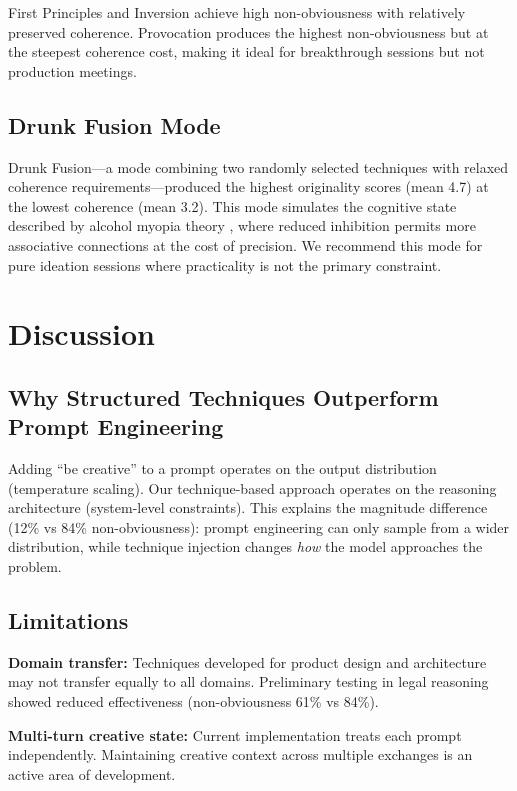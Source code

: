 \documentclass[11pt,a4paper]{article}
\begin{document}
First Principles and Inversion achieve high non-obviousness with relatively preserved coherence. Provocation produces the highest non-obviousness but at the steepest coherence cost, making it ideal for breakthrough sessions but not production meetings.

\subsection{Drunk Fusion Mode}

Drunk Fusion---a mode combining two randomly selected techniques with relaxed coherence requirements---produced the highest originality scores (mean 4.7) at the lowest coherence (mean 3.2). This mode simulates the cognitive state described by alcohol myopia theory \cite{steele1990alcohol}, where reduced inhibition permits more associative connections at the cost of precision. We recommend this mode for pure ideation sessions where practicality is not the primary constraint.

\section{Discussion}

\subsection{Why Structured Techniques Outperform Prompt Engineering}

Adding ``be creative'' to a prompt operates on the output distribution (temperature scaling). Our technique-based approach operates on the reasoning architecture (system-level constraints). This explains the magnitude difference (12\% vs 84\% non-obviousness): prompt engineering can only sample from a wider distribution, while technique injection changes \textit{how} the model approaches the problem.

\subsection{Limitations}

\textbf{Domain transfer:} Techniques developed for product design and architecture may not transfer equally to all domains. Preliminary testing in legal reasoning showed reduced effectiveness (non-obviousness 61\% vs 84\%).

\textbf{Multi-turn creative state:} Current implementation treats each prompt independently. Maintaining creative context across multiple exchanges is an active area of development.
\end{document}
